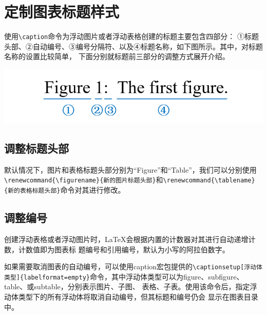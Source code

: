 \section{定制图表标题样式}

使用\texttt{\textbackslash{}caption}命令为浮动图片或者浮动表格创建的标题主要包含四部分：
①标题头部、②自动编号、③编号分隔符、以及④标题名称，如下图所示。其中，对标题名称的设置比较简单，
下面分别就标题前三部分的调整方式展开介绍。

\begin{center}
    \includegraphics{images/Image_title_part.png}
    \label{fig:1}
\end{center}

\subsection{调整标题头部}

默认情况下，图片和表格标题头部分别为“Figure”和“Table”，我们可以分别使用\texttt{\textbackslash{}renewcommand\{\textbackslash{}figurename\}\{新的图片标题头部\}}和\texttt{\textbackslash{}renewcommand\{\textbackslash{}tablename\}\{新的表格标题头部\}}命令对其进行修改。

\subsection{调整编号}

创建浮动表格或者浮动图片时，LaTeX会根据内置的计数器对其进行自动递增计数，计数值即为图表标
题编号和引用编号，默认为小写的阿拉伯数字。

如果需要取消图表的自动编号，可以使用caption宏包提供的\texttt{\textbackslash{}captionsetup[浮动体类型]\{labelformat=empty\}}命令，其中浮动体类型可以为figure、subfigure、table、或subtable，分别表示图片、子图、
表格、子表。使用该命令后，指定浮动体类型下的所有浮动体将取消自动编号，但其标题和编号仍会
显示在图表目录中。

